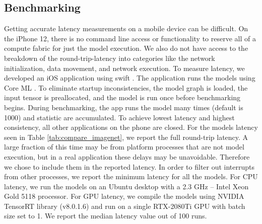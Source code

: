 \subsection{Benchmarking}\label{sec:benchmarking}
Getting accurate latency measurements on a mobile device can be difficult. On the iPhone 12, there is no command line access or functionality to reserve all of a compute fabric for just the model execution. We also do not have access to the breakdown of the round-trip-latency into categories like the network initialization, data movement, and network execution. To measure latency, we developed an iOS application using swift \cite{swift_language}.
The application runs the models using Core ML \cite{coremltools}. To eliminate  startup  inconsistencies, the model graph is loaded, the input tensor is preallocated, and the model is run once before benchmarking begins. During benchmarking, the app runs the model many times (default is 1000) and statistic are accumulated. To achieve lowest latency and highest consistency, all other applications on the phone are closed. 
For the models latency seen in Table \ref{tab:compare_imagenet}, we report the full round-trip latency. A large fraction of this time may be from platform processes that are not model execution, but in a real application these delays may be unavoidable. Therefore we chose to include them in the reported latency.  In order to filter out interrupts from other processes, we report the minimum latency for all the models.
For CPU latency, we run the models on an Ubuntu desktop with a 2.3 GHz -- Intel Xeon Gold 5118 processor. For GPU latency, we compile the models using NVIDIA TensorRT library (v8.0.1.6) and run on a single RTX-2080Ti GPU with batch size set to 1. We report the median latency value out of 100 runs.
